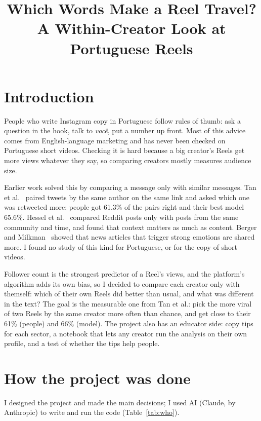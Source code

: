 \documentclass[conference]{IEEEtran}
\begin{document}
\title{Which Words Make a Reel Travel?\\A Within-Creator Look at Portuguese Reels}

\author{
}

\maketitle

\section{Introduction}
People who write Instagram copy in Portuguese follow rules of thumb: ask a question in the hook, talk to \textit{voc\^e}, put a number up front.
Most of this advice comes from English-language marketing and has never been checked on Portuguese short videos.
Checking it is hard because a big creator's Reels get more views whatever they say, so comparing creators mostly measures audience size.

Earlier work solved this by comparing a message only with similar messages.
Tan et al.~\cite{tan2014} paired tweets by the same author on the same link and asked which one was retweeted more: people got 61.3\% of the pairs right and their best model 65.6\%.
Hessel et al.~\cite{hessel2017} compared Reddit posts only with posts from the same community and time, and found that context matters as much as content.
Berger and Milkman~\cite{berger2012} showed that news articles that trigger strong emotions are shared more.
I found no study of this kind for Portuguese, or for the copy of short videos.

Follower count is the strongest predictor of a Reel's views, and the platform's algorithm adds its own bias, so I decided to compare each creator only with themself: which of their own Reels did better than usual, and what was different in the text?
The goal is the measurable one from Tan et al.: pick the more viral of two Reels by the same creator more often than chance, and get close to their 61\% (people) and 66\% (model).
The project also has an educator side: copy tips for each sector, a notebook that lets any creator run the analysis on their own profile, and a test of whether the tips help people.

\section{How the project was done}
I designed the project and made the main decisions; I used AI (Claude, by Anthropic) to write and run the code (Table~\ref{tab:who}).
\end{document}
